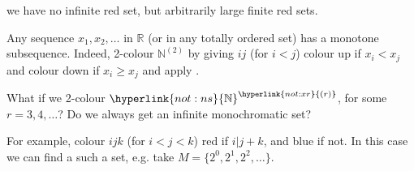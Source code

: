 \documentclass{article}
\newcommand{\red}[1]{\textcolor{bred}{#1}}
\newcommand{\blue}[1]{\textcolor{bblue}{#1}}
\begin{document}
\begin{remark}
\begin{enumerate}[(i)]
\begin{center}
        \end{center}
  we have no infinite red set, but arbitrarily large finite red sets.
  \end{enumerate}
\end{remark}
\begin{eg}
  Any sequence $x_1, x_2, \dotsc$ in $\mathbb{R}$ (or in any totally ordered set) has a monotone subsequence.
  Indeed, 2-colour $\mathbb{N}^{(2)}$ by giving $ij$ (for $i<j$) colour \red{up} if $x_i < x_j$ and colour \blue{down} if $x_i \geq x_j$ and apply .
\end{eg}
\newlec
What if we 2-colour $\hyperlink{not:ns}{\mathbb{N}}^{\hyperlink{not:xr}{(r)}}$, for some $r=3, 4, \dotsc$? Do we always get an infinite monochromatic set?
\begin{center}
\end{center}
For example, colour $ijk$ (for $i < j < k$) \red{red} if $i | j +k$, and \blue{blue} if not.
In this case we can find a such a set, e.g. take $M = \{2^0, 2^1, 2^2, \dotsc\}$.
\end{document}
